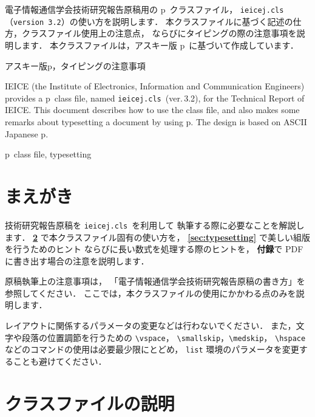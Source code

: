 \documentclass[technicalreport]{ieicej}
\def\IEICEJcls{\texttt{ieicej.cls}}
\def\IEICEJver{3.2}
\begin{document}
\begin{jabstract}
電子情報通信学会技術研究報告原稿用の p\LaTeXe\ クラスファイル，
\IEICEJcls{}（\texttt{version \IEICEJver}）の使い方を説明します．
本クラスファイルに基づく記述の仕方，クラスファイル使用上の注意点，
ならびにタイピングの際の注意事項を説明します．
本クラスファイルは，アスキー版 p\LaTeXe\ に基づいて作成しています．
\end{jabstract}
\begin{jkeyword}
アスキー版p\LaTeXe{}，タイピングの注意事項
\end{jkeyword}
\begin{eabstract}
IEICE (the Institute of Electronics, Information 
and Communication Engineers) provides 
a p\LaTeXe\ class file, named \IEICEJcls\ (ver.\,\IEICEJver), 
for the Technical Report of IEICE. 
This document describes how to use the class file, 
and also makes some remarks about typesetting a document by using p\LaTeXe. 
The design is based on ASCII Japanese p\LaTeXe. 
\end{eabstract}
\begin{ekeyword}
p\LaTeXe\ class file, typesetting
\end{ekeyword}
\maketitle

\section{まえがき}

技術研究報告原稿を \IEICEJcls\ を利用して
執筆する際に必要なことを解説します．
{\bfseries \ref{sec:cls}} で本クラスファイル固有の使い方を，
{\bfseries \ref{sec:typesetting}} で美しい組版を行うためのヒント
ならびに長い数式を処理する際のヒントを，
{\bfseries 付録}で PDF に書き出す場合の注意を説明します．

原稿執筆上の注意事項は，
「電子情報通信学会技術研究報告原稿の書き方」を参照してください．
ここでは，本クラスファイルの使用にかかわる点のみを説明します．

レイアウトに関係するパラメータの変更などは行わないでください．
また，文字や段落の位置調節を行うための \verb/\vspace/，
\verb/\smallskip/，\verb/\medskip/，
\verb/\hspace/ などのコマンドの使用は必要最少限にとどめ，
\texttt{list} 環境のパラメータを変更することも避けてください．

\section{クラスファイルの説明}
\label{sec:cls}
\end{document}
